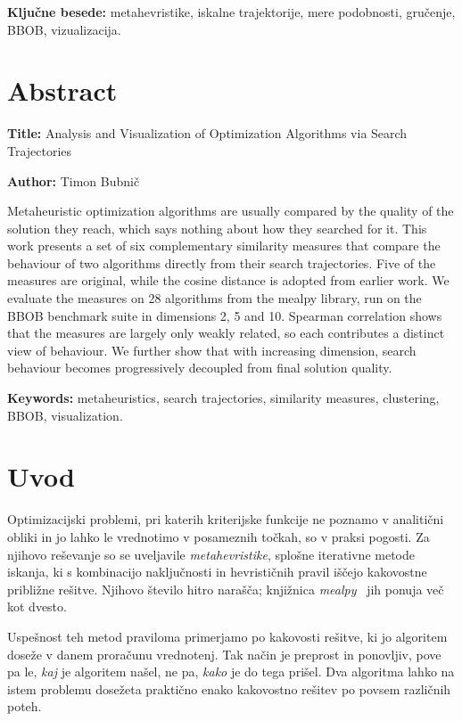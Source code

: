 \documentclass[a4paper, 12pt]{book}
\newcommand{\ttitleEn}{Analysis and Visualization of Optimization Algorithms via Search Trajectories}
\newcommand{\tauthor}{Timon Bubnič}
\newcommand{\tkeywords}{metahevristike, iskalne trajektorije, mere podobnosti, gručenje, BBOB, vizualizacija}
\newcommand{\tkeywordsEn}{metaheuristics, search trajectories, similarity measures, clustering, BBOB, visualization}
\newcommand{\clearemptydoublepage}{\newpage{\pagestyle{empty}\cleardoublepage}}
\begin{document}
\bigskip

\noindent\textbf{Ključne besede:} \tkeywords.
\clearemptydoublepage

\chapter*{Abstract}

\noindent\textbf{Title:} \ttitleEn
\bigskip

\noindent\textbf{Author:} \tauthor
\bigskip

\noindent
Metaheuristic optimization algorithms are usually compared by the quality of
the solution they reach, which says nothing about how they searched for it.
This work presents a set of six complementary similarity measures that
compare the behaviour of two algorithms directly from their search
trajectories. Five of the measures are original, while the cosine distance is
adopted from earlier work. We evaluate the measures on 28 algorithms from the
mealpy library, run on the BBOB benchmark suite in dimensions 2, 5 and 10.
Spearman correlation shows that the measures are largely only weakly related,
so each contributes a distinct view of behaviour. We further show that with
increasing dimension, search behaviour becomes progressively decoupled from
final solution quality.

\bigskip

\noindent\textbf{Keywords:} \tkeywordsEn.
\clearemptydoublepage

\mainmatter
\setcounter{page}{1}
\pagestyle{fancy}

\chapter{Uvod}

Optimizacijski problemi, pri katerih kriterijske funkcije ne poznamo v
analitični obliki in jo lahko le vrednotimo v posameznih točkah, so v praksi
pogosti. Za njihovo reševanje so se uveljavile \emph{metahevristike}, splošne
iterativne metode iskanja, ki s kombinacijo naključnosti in hevrističnih
pravil iščejo kakovostne približne rešitve. Njihovo število hitro narašča;
knjižnica \emph{mealpy}~\cite{van2023mealpy} jih ponuja več kot dvesto.

Uspešnost teh metod praviloma primerjamo po kakovosti rešitve, ki jo
algoritem doseže v danem proračunu vrednotenj. Tak način je preprost in
ponovljiv, pove pa le, \emph{kaj} je algoritem našel, ne pa, \emph{kako} je
do tega prišel. Dva algoritma lahko na istem problemu dosežeta praktično
enako kakovostno rešitev po povsem različnih poteh.
\end{document}
